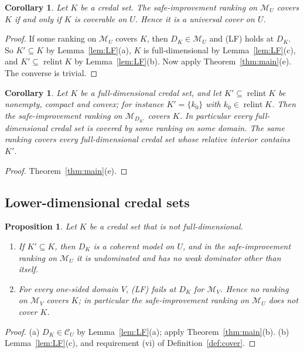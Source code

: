 \documentclass[11pt]{article}
\newcommand{\M}{\mathcal{M}}
\newcommand{\CC}{\mathcal{C}}
\DeclareMathOperator{\relint}{relint}
\theoremstyle{plain}
\newtheorem{proposition}[theorem]{Proposition}
\newtheorem{corollary}[theorem]{Corollary}
\theoremstyle{definition}
\theoremstyle{remark}
\begin{document}
\begin{corollary}\label{cor:universal}
Let $K$ be a credal set. The safe-improvement ranking on $\M_U$ covers $K$ if and only if
$K$ is coverable on $U$. Hence it is a universal cover on $U$.
\end{corollary}

\begin{proof}
If some ranking on $\M_U$ covers $K$, then $D_K\in\M_U$ and (LF) holds at $D_K$. So
$K'\subseteq K$ by Lemma~\ref{lem:LF}(a), $K$ is full-dimensional by
Lemma~\ref{lem:LF}(c), and $K'\subseteq\relint K$ by Lemma~\ref{lem:LF}(b). Now apply
Theorem~\ref{thm:main}(e). The converse is trivial.
\end{proof}

\begin{corollary}\label{cor:every}
Let $K$ be a full-dimensional credal set, and let $K'\subseteq\relint K$ be nonempty,
compact and convex; for instance $K'=\{k_0\}$ with $k_0\in\relint K$. Then the
safe-improvement ranking on $\M_{D_{K'}}$ covers $K$. In particular every
full-dimensional credal set is covered by some ranking on some domain. The same ranking
covers every full-dimensional credal set whose relative interior contains $K'$.
\end{corollary}

\begin{proof}
Theorem~\ref{thm:main}(e).
\end{proof}

\subsection{Lower-dimensional credal sets}

\begin{proposition}\label{prop:lowdim}
Let $K$ be a credal set that is not full-dimensional.
\begin{enumerate}[label=(\alph*)]
  \item If $K'\subseteq K$, then $D_K$ is a coherent model on $U$, and in the
  safe-improvement ranking on $\M_U$ it is undominated and has no weak dominator other
  than itself.
  \item For every one-sided domain $V$, (LF) fails at $D_K$ for $\M_V$. Hence no ranking
  on $\M_V$ covers $K$; in particular the safe-improvement ranking on $\M_U$ does not
  cover $K$.
\end{enumerate}
\end{proposition}

\begin{proof}
(a) $D_K\in\CC_U$ by Lemma~\ref{lem:LF}(a); apply Theorem~\ref{thm:main}(b).
(b) Lemma~\ref{lem:LF}(c), and requirement (vi) of Definition~\ref{def:cover}.
\end{proof}
\end{document}
